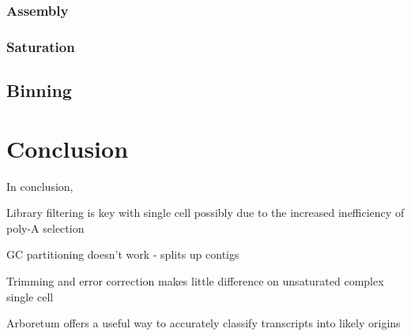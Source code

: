 \subsubsection{Assembly}
\subsubsection{Saturation}

\subsection{Binning}

%



\section{Conclusion}
In conclusion,

Library filtering is key with single cell possibly due to the increased inefficiency of poly-A selection

GC partitioning doesn't work - splits up contigs

Trimming and error correction makes little difference on unsaturated complex single cell 

Arboretum offers a useful way to accurately classify transcripts into likely origins 



